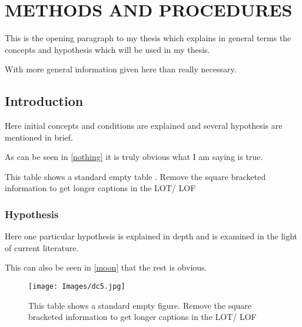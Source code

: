 \chapter{\MakeUppercase{Methods and Procedures}}

This is the opening paragraph to my thesis which
explains in general terms the concepts and hypothesis
which will be used in my thesis.

With more general information given here than really
necessary.

\section{Introduction}

Here initial concepts and conditions are explained and
several hypothesis are mentioned in brief.

As can be seen in \autoref{nothing} it is truly
obvious what I am saying is true.

\begin{table}[h!tb] \centering

    \caption[Short caption for List of Figures/ Tables]{This table shows a standard empty table \autocite{kleeHellyTheoremIts1963}. Remove the square bracketed information to get longer captions in the LOT/ LOF }
    \label{nothing}

    \vspace{ 2 in}
\end{table}

\subsection{Hypothesis}

Here one particular hypothesis is explained in depth
and is examined in the light of current literature.

This can also be seen in \autoref{moon} that the
rest is obvious.

\begin{figure}[h!tb] \centering

    \texttt{[image: Images/dc5.jpg]}
    \caption[Short caption for List of Figures/ Tables]{This table shows a standard empty figure. Remove the square bracketed information to get longer captions in the LOT/ LOF}
    \label{moon}
\end{figure}

